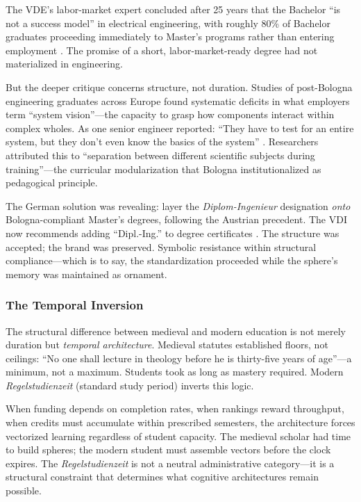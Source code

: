 The VDE's labor-market expert concluded after 25 years that the Bachelor ``is not a success model'' in electrical engineering, with roughly 80\% of Bachelor graduates proceeding immediately to Master's programs rather than entering employment \citep{schanz2025}. The promise of a short, labor-market-ready degree had not materialized in engineering.

But the deeper critique concerns structure, not duration. Studies of post-Bologna engineering graduates across Europe found systematic deficits in what employers term ``system vision''---the capacity to grasp how components interact within complex wholes. As one senior engineer reported: ``They have to test for an entire system, but they don't even know the basics of the system'' \citep{kovesi2016}. Researchers attributed this to ``separation between different scientific subjects during training''---the curricular modularization that Bologna institutionalized as pedagogical principle.

The German solution was revealing: layer the \textit{Diplom-Ingenieur} designation \textit{onto} Bologna-compliant Master's degrees, following the Austrian precedent. The VDI now recommends adding ``Dipl.-Ing.'' to degree certificates \citep{vdi2024}. The structure was accepted; the brand was preserved. Symbolic resistance within structural compliance---which is to say, the standardization proceeded while the sphere's memory was maintained as ornament.

\subsubsection{The Temporal Inversion}

The structural difference between medieval and modern education is not merely duration but \textit{temporal architecture}. Medieval statutes established floors, not ceilings: ``No one shall lecture in theology before he is thirty-five years of age''---a minimum, not a maximum. Students took as long as mastery required. Modern \textit{Regelstudienzeit} (standard study period) inverts this logic.

When funding depends on completion rates, when rankings reward throughput, when credits must accumulate within prescribed semesters, the architecture forces vectorized learning regardless of student capacity. The medieval scholar had time to build spheres; the modern student must assemble vectors before the clock expires. The \textit{Regelstudienzeit} is not a neutral administrative category---it is a structural constraint that determines what cognitive architectures remain possible.

